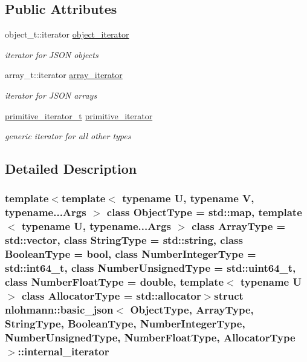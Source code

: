 \subsection*{Public Attributes}
\begin{DoxyCompactItemize}
\item 
object\+\_\+t\+::iterator \hyperlink{structnlohmann_1_1basic__json_1_1internal__iterator_abad8000f0a29137d6f88e8cc61ef42f9}{object\+\_\+iterator}
\begin{DoxyCompactList}\small\item\em iterator for J\+S\+O\+N objects \end{DoxyCompactList}\item 
array\+\_\+t\+::iterator \hyperlink{structnlohmann_1_1basic__json_1_1internal__iterator_af92f51f4d6c715e46b1e1f8dface2be9}{array\+\_\+iterator}
\begin{DoxyCompactList}\small\item\em iterator for J\+S\+O\+N arrays \end{DoxyCompactList}\item 
\hyperlink{classnlohmann_1_1basic__json_1_1primitive__iterator__t}{primitive\+\_\+iterator\+\_\+t} \hyperlink{structnlohmann_1_1basic__json_1_1internal__iterator_ac7eab7e31d99f301ba366ee274769771}{primitive\+\_\+iterator}
\begin{DoxyCompactList}\small\item\em generic iterator for all other types \end{DoxyCompactList}\end{DoxyCompactItemize}


\subsection{Detailed Description}
\subsubsection*{template$<$template$<$ typename U, typename V, typename...\+Args $>$ class Object\+Type = std\+::map, template$<$ typename U, typename...\+Args $>$ class Array\+Type = std\+::vector, class String\+Type = std\+::string, class Boolean\+Type = bool, class Number\+Integer\+Type = std\+::int64\+\_\+t, class Number\+Unsigned\+Type = std\+::uint64\+\_\+t, class Number\+Float\+Type = double, template$<$ typename U $>$ class Allocator\+Type = std\+::allocator$>$struct nlohmann\+::basic\+\_\+json$<$ Object\+Type, Array\+Type, String\+Type, Boolean\+Type, Number\+Integer\+Type, Number\+Unsigned\+Type, Number\+Float\+Type, Allocator\+Type $>$\+::internal\+\_\+iterator}

